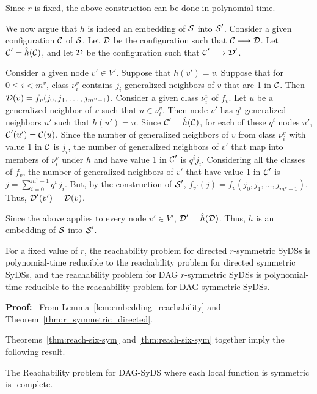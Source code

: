 Since $r$ is fixed, the above construction can be done in polynomial time.

We now argue that $h$ is indeed an embedding of $\mbox{$\mathcal{S}$}$ into $\mbox{$\mathcal{S}$}'$.
Consider a given configuration $\mbox{$\mathcal{C}$}$ of $\mbox{$\mathcal{S}$}$.
Let $\mbox{$\mathcal{D}$}$  be the configuration such that $\mbox{$\mathcal{C}$} \longrightarrow \mbox{$\mathcal{D}$}$.
Let $\mbox{$\mathcal{C}$}' =\hat{h}(\mbox{$\mathcal{C}$})$, 
and let $\mbox{$\mathcal{D}$}$  be the configuration such that $\mbox{$\mathcal{C}$}' \longrightarrow \mbox{$\mathcal{D}$}'$.

Consider a given node $v' \in V'$.
Suppose that $h(v') = v$.
Suppose that for $0 \leq i < m^v$,
class $\nu_i^v$ contains $j_i$ generalized neighbors of $v$ that are 1 in $\mbox{$\mathcal{C}$}$.
Then $\mbox{$\mathcal{D}$}(v) = f_v(j_0,  j_1, \ldots , j_{m^v -1})$.
Consider a given class $\nu_i^v$ of $f_v$.
Let $u$ be a generalized neighbor of $v$ such that $ u \in \nu_i^v$.
Then node $v'$ has $q^i$ generalized neighbors $u'$ such that $h(u') = u$.
Since $\mbox{$\mathcal{C}$}' =\hat{h}(\mbox{$\mathcal{C}$})$, for each of these $q^i$ nodes $u'$,
$\mbox{$\mathcal{C}$}'(u') = \mbox{$\mathcal{C}$}(u)$.
Since the number of generalized neighbors of $v$ from class $\nu_i^v$ 
with value 1 in $\mbox{$\mathcal{C}$}$ is $j_i$,
the number of generalized neighbors of $v'$ 
that map into members of $\nu_i^v$ under $h$ and have value 1 in $\mbox{$\mathcal{C}$}'$ is $q^i j_i$.
Considering all the classes of $f_v$,
the number of generalized neighbors of $v'$ that have value 1 in $\mbox{$\mathcal{C}$}'$ is 
$j = \sum_{i=0}^{m^v-1} q^i \, j_i$.
But, by the construction of $\mbox{$\mathcal{S}$}'$,
$f_{v'}(j) = f_v(j_0,  j_1, \ldots , j_{m^v -1})$.
Thus, $\mbox{$\mathcal{D}$}'(v') = \mbox{$\mathcal{D}$}(v)$.

Since the above applies to every node $v' \in V'$,  $\mbox{$\mathcal{D}$}' =\hat{h}(\mbox{$\mathcal{D}$})$.
Thus, $h$ is an embedding of $\mbox{$\mathcal{S}$}$ into $\mbox{$\mathcal{S}$}'$.
\QED
\fi

\begin{theorem}\label{thm:reachability_symmetric}
For a fixed value of $r$, the reachability problem for directed
$r$-symmetric  SyDSs is polynomial-time reducible to the reachability
problem for directed symmetric SyDSs, and  the reachability problem
for DAG $r$-symmetric  SyDSs is polynomial-time reducible to the
reachability problem for DAG  symmetric  SyDSs.  
\end{theorem}

\noindent 
\textbf{Proof:}~ From Lemma~\ref{lem:embedding_reachability}
and Theorem~\ref{thm:r_symmetric_directed}.  \QED

Theorems~\ref{thm:reach-six-sym} and \ref{thm:reach-six-sym}
together imply the following result.

\begin{theorem}\label{thm:dag_syds_sym_hard}
The Reachability problem for DAG-SyDS where each local function is
symmetric is \cpsp-complete. \QED
\end{theorem}

